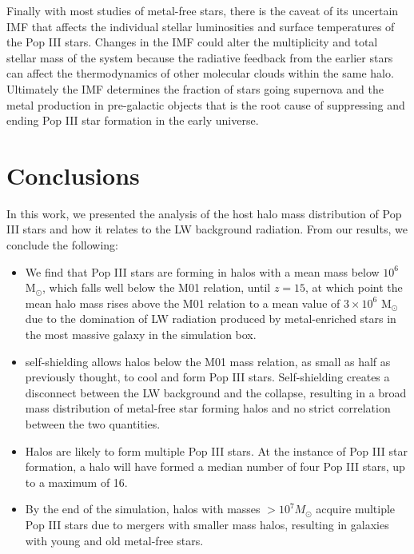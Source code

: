 \documentclass[fleqn,usenatbib]{mnras}
\begin{document}
Finally with most studies of metal-free stars, there is the caveat of its uncertain IMF that affects the individual stellar luminosities and surface temperatures of the Pop III stars.  Changes in the IMF could alter the multiplicity and total stellar mass of the system because the radiative feedback from the earlier stars can affect the thermodynamics of other molecular clouds within the same halo.  Ultimately the IMF determines the fraction of stars going supernova and the metal production in pre-galactic objects that is the root cause of suppressing and ending Pop III star formation in the early universe.

\section{Conclusions}
In this work, we presented the analysis of the host halo mass distribution of Pop III stars and how it relates to the LW background radiation. From our results, we conclude the following: 

\begin{itemize}
	\item We find that Pop III stars are forming in halos with a mean mass below $10^{6}$ M$_{\odot}$, which falls well below the M01 relation, until $z=15$, at which point the mean halo mass rises above the M01 relation to a mean value of $3 \times 10^{6}$ M$_{\odot}$ due to the domination of LW radiation produced by metal-enriched stars in the most massive galaxy in the simulation box.
	\item \hh{} self-shielding allows halos below the M01 mass relation, as small as half as previously thought, to cool and form Pop III stars.  Self-shielding creates a disconnect between the LW background and the collapse, resulting in a broad mass distribution of metal-free star forming halos and no strict correlation between the two quantities.
	\item Halos are likely to form multiple Pop III stars. At the instance of Pop III star formation, a halo will have formed a median number of four Pop III stars, up to a maximum of 16.
	\item By the end of the simulation, halos with masses $>10^{7} M_{\odot}$ acquire multiple Pop III stars due to mergers with smaller mass halos, resulting in galaxies with young and old metal-free stars. 
\end{itemize}
\end{document}
